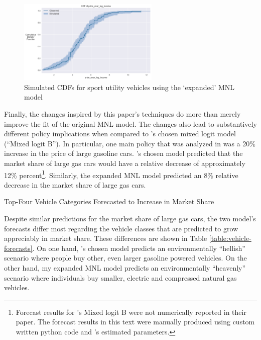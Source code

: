 \documentclass[preprint]{elsarticle}
\begin{document}
\begin{figure}
\centering
\includegraphics[width=0.6\textwidth]{cdf-vehicle-choice-interaction-mnl-suv-price}
\caption{Simulated CDFs for sport utility vehicles using the `expanded' MNL model}
\label{fig:new-mnl-suv-cdf}
\end{figure}

Finally, the changes inspired by this paper's techniques do more than merely improve the fit of the original MNL model. The changes also lead to substantively different policy implications when compared to \citeauthor{brownstone_forecasting_1998}'s chosen mixed logit model (``Mixed logit B''). In particular, one main policy that was analyzed in \citet{brownstone_forecasting_1998} was a 20\% increase in the price of large gasoline cars. \citeauthor{brownstone_forecasting_1998}'s chosen model predicted that the market share of large gas cars would have a relative decrease of approximately 12\% percent\footnote{Forecast results for \citeauthor{brownstone_forecasting_1998}'s Mixed logit B were not numerically reported in their paper. The forecast results in this text were manually produced using custom written python code and \citeauthor{brownstone_forecasting_1998}'s estimated parameters.}. Similarly, the expanded MNL model predicted an 8\% relative decrease in the market share of large gas cars.

\begin{table}
\centering

\caption{Top-Four Vehicle Categories Forecasted to Increase in Market Share}
\label{table:vehicle-forecasts}
\end{table}

Despite similar predictions for the market share of large gas cars, the two model's forecasts differ most regarding the vehicle classes that are predicted to grow appreciably in market share. These differences are shown in Table \ref{table:vehicle-forecasts}. On one hand, \citeauthor{brownstone_forecasting_1998}'s chosen model predicts an environmentally ``hellish'' scenario where people buy other, even larger gasoline powered vehicles. On the other hand, my expanded MNL model predicts an environmentally ``heavenly'' scenario where individuals buy smaller, electric and compressed natural gas vehicles.
\end{document}
